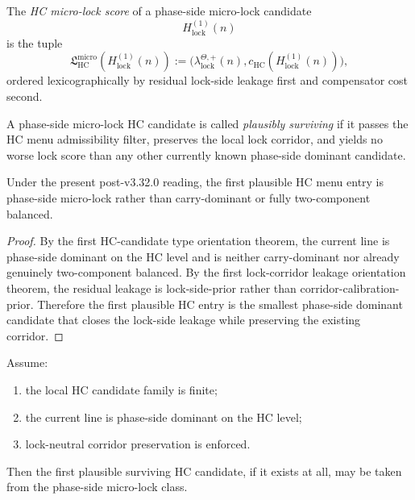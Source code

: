 \begin{definition}
\label{def:hc-micro-lock-score}
The \emph{HC micro-lock score} of a phase-side micro-lock candidate
\[
  H_{\mathrm{lock}}^{(1)}(n)
\]
is the tuple
\[
  \mathfrak L_{\mathrm{HC}}^{\mathrm{micro}}(H_{\mathrm{lock}}^{(1)}(n))
  :=
  \bigl(
    \lambda_{\mathrm{lock}}^{\Theta,+}(n),
    c_{\mathrm{HC}}(H_{\mathrm{lock}}^{(1)}(n))
  \bigr),
\]
ordered lexicographically by residual lock-side leakage first and compensator cost second.
\end{definition}

\begin{definition}
\label{def:plausible-surviving-hc-candidate}
A phase-side micro-lock HC candidate is called \emph{plausibly surviving} if it passes the HC menu admissibility filter, preserves the local lock corridor, and yields no worse lock score than any other currently known phase-side dominant candidate.
\end{definition}

\begin{proposition}
\label{prop:current-line-favors-a-phase-side-micro-lock-candidate}
Under the present post-v3.32.0 reading, the first plausible HC menu entry is phase-side micro-lock rather than carry-dominant or fully two-component balanced.
\end{proposition}

\begin{proof}
By the first HC-candidate type orientation theorem, the current line is phase-side dominant on the HC level and is neither carry-dominant nor already genuinely two-component balanced. By the first lock-corridor leakage orientation theorem, the residual leakage is lock-side-prior rather than corridor-calibration-prior. Therefore the first plausible HC entry is the smallest phase-side dominant candidate that closes the lock-side leakage while preserving the existing corridor.
\end{proof}

\begin{lemma}
\label{lem:plausible-survival-of-the-phase-side-micro-lock-candidate}
Assume:
\begin{enumerate}[leftmargin=2em,label=(\alph*)]
  \item the local HC candidate family is finite;
  \item the current line is phase-side dominant on the HC level;
  \item lock-neutral corridor preservation is enforced.
\end{enumerate}
Then the first plausible surviving HC candidate, if it exists at all, may be taken from the phase-side micro-lock class.
\end{lemma}

